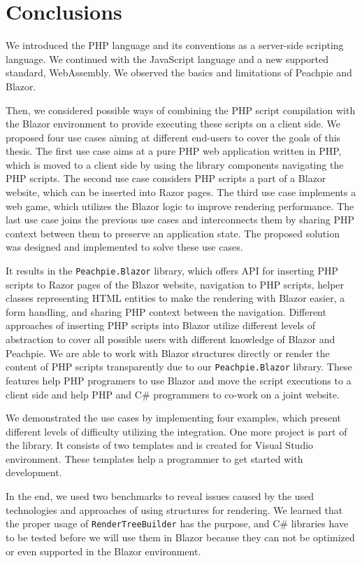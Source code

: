 \chapter{Conclusions}

We introduced the PHP language and its conventions as a server-side scripting language.
We continued with the JavaScript language and a new supported standard, WebAssembly.
We observed the basics and limitations of Peachpie and Blazor.
\par
Then, we considered possible ways of combining the PHP script compilation with the Blazor environment to provide executing these scripts on a client side.
We proposed four use cases aiming at different end-users to cover the goals of this thesis.
The first use case aims at a pure PHP web application written in PHP, which is moved to a client side by using the library components navigating the PHP scripts.
The second use case considers PHP scripts a part of a Blazor website, which can be inserted into Razor pages.
The third use case implements a web game, which utilizes the Blazor logic to improve rendering performance.
The last use case joins the previous use cases and interconnects them by sharing PHP context between them to preserve an application state.  
The proposed solution was designed and implemented to solve these use cases.
\par
It results in the \texttt{Peachpie.Blazor} library, which offers API for inserting PHP scripts to Razor pages of the Blazor website, navigation to PHP scripts, helper classes representing HTML entities to make the rendering with Blazor easier, a form handling, and sharing PHP context between the navigation.
Different approaches of inserting PHP scripts into Blazor utilize different levels of abstraction to cover all possible users with different knowledge of Blazor and Peachpie.
We are able to work with Blazor structures directly or render the content of PHP scripts transparently due to our \texttt{Peachpie.Blazor} library.
These features help PHP programers to use Blazor and move the script executions to a client side and help PHP and C\# programmers to co-work on a joint website.
\par
We demonstrated the use cases by implementing four examples, which present different levels of difficulty utilizing the integration.
One more project is part of the library. It consists of two templates and is created for Visual Studio environment.
These templates help a programmer to get started with development.
\par
In the end, we used two benchmarks to reveal issues caused by the used technologies and approaches of using structures for rendering.
We learned that the proper usage of \texttt{RenderTreeBuilder} has the purpose, and C\# libraries have to be tested before we will use them in Blazor because they can not be optimized or even supported in the Blazor environment.

